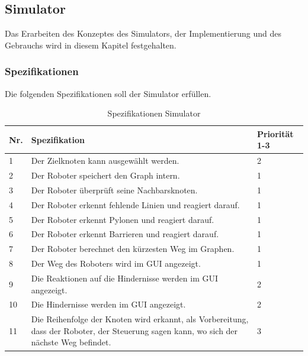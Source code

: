 \subsection{Simulator}

Das Erarbeiten des Konzeptes des Simulators, der Implementierung und des Gebrauchs wird in diesem Kapitel festgehalten.




\subsubsection{Spezifikationen}

Die folgenden Spezifikationen soll der Simulator erfüllen.

\begin{table}[H]
\centering
\small
\begin{tabularx}{\textwidth}{|l|X|l|}
\hline
  \textbf{Nr.} & \textbf{Spezifikation} & \textbf{Priorität 1-3}  \\
  \hline
  1  & Der Zielknoten kann ausgewählt werden. &  2\\
  \hline
   2   & Der Roboter speichert den Graph intern.  & 1\\
  \hline
   3 & Der Roboter überprüft seine Nachbarsknoten.&1\\
  \hline
  4 & Der Roboter erkennt fehlende Linien und reagiert darauf. & 1\\
  \hline
  5 &   Der Roboter erkennt Pylonen und reagiert darauf. & 1\\
  \hline
   6  &   Der Roboter erkennt Barrieren und reagiert darauf. & 1\\
  \hline
    7 &   Der Roboter berechnet den kürzesten Weg im Graphen.& 1\\
  \hline
     8  &   Der Weg des Roboters wird im GUI angezeigt. & 1\\
  \hline
      9   &   Die Reaktionen auf die Hindernisse werden im GUI angezeigt. & 2\\
  \hline
 10   &   Die Hindernisse werden im GUI angezeigt. & 2\\
  \hline
   11   &   Die Reihenfolge der Knoten wird erkannt, als Vorbereitung, dass der Roboter, der Steuerung sagen kann, wo sich der nächste Weg befindet. & 3\\
  \hline

\end{tabularx}
\caption{Spezifikationen Simulator}
\label{table:spezifikation-simulator}
\end{table}

